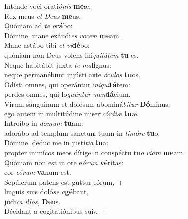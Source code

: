 \evenverse Inténde voci orati\textit{ó}\textit{nis} \textbf{me}æ:~\*\\
\evenverse Rex meus \textit{et} \textit{De}\textit{us} \textbf{me}us.\\
\oddverse Quóniam ad \textit{te} \textit{o}\textbf{rá}bo:~\*\\
\oddverse Dómine, mane exáudi\textit{es} \textit{vo}\textit{cem} \textbf{me}am.\\
\evenverse Mane astábo tibi \textit{et} \textit{vi}\textbf{dé}bo:~\*\\
\evenverse quóniam non Deus volens ini\textit{qui}\textit{tá}\textit{tem} \textbf{tu} es.\\
\oddverse Neque habitábit juxta \textit{te} \textit{ma}\textbf{lí}gnus:~\*\\
\oddverse neque permanébunt injústi ante \textit{ó}\textit{cu}\textit{los} \textbf{tu}os.\\
\evenverse Odísti omnes, qui operántur i\textit{ni}\textit{qui}\textbf{tá}tem:~\*\\
\evenverse perdes omnes, qui lo\textit{quún}\textit{tur} \textit{men}\textbf{dá}cium.\\
\oddverse Virum sánguinum et dolósum abominá\textit{bi}\textit{tur} \textbf{Dó}minus:~\*\\
\oddverse ego autem in multitúdine miseri\textit{cór}\textit{di}\textit{æ} \textbf{tu}æ.\\
\evenverse Introíbo in \textit{do}\textit{mum} \textbf{tu}am:~\*\\
\evenverse adorábo ad templum sanctum tuum in \textit{ti}\textit{mó}\textit{re} \textbf{tu}o.\\
\oddverse Dómine, deduc me in justí\textit{ti}\textit{a} \textbf{tu}a:~\*\\
\oddverse propter inimícos meos dírige in conspéctu tu\textit{o} \textit{vi}\textit{am} \textbf{me}am.\\
\evenverse Quóniam non est in ore e\textit{ó}\textit{rum} \textbf{vé}ritas:~\*\\
\evenverse cor \textit{e}\textit{ó}\textit{rum} \textbf{va}num est.\\
\oddverse Sepúlcrum patens est guttur eórum,~+\\
\oddverse  linguis suis doló\textit{se} \textit{a}\textbf{gé}bant,~\*\\
\oddverse júdi\textit{ca} \textit{il}\textit{los}, \textbf{De}us.\\
\evenverse Décidant a cogitatiónibus suis,~+\\
